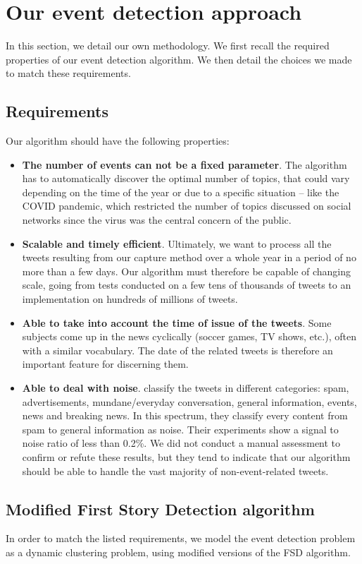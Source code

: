 \section{Our event detection approach}

In this section, we detail our own methodology. We first recall the required properties of our event detection algorithm. We then detail the choices we made to match these requirements.
\subsection{Requirements}
Our algorithm should have the following properties:
\begin{itemize}
    \item \textbf{The number of events can not be a fixed parameter}. The algorithm has to automatically discover the optimal number of topics, that could vary depending on the time of the year or due to a specific situation -- like the COVID pandemic, which restricted the number of topics discussed on social networks since the virus was the central concern of the public.
    \item \textbf{Scalable and timely efficient}. Ultimately, we want to process all the tweets resulting from our capture method over a whole year in a period of no more than a few days. Our algorithm must therefore be capable of changing scale, going from tests conducted on a few tens of thousands of tweets to an implementation on hundreds of millions of tweets.
    \item \textbf{Able to take into account the time of issue of the tweets}. Some subjects come up in the news cyclically (soccer games, TV shows, etc.), often with a similar vocabulary. The date of the related tweets is therefore an important feature for discerning them.
    \item \textbf{Able to deal with noise}. \citet{liu_reuters_2017} classify the tweets in different categories: spam, advertisements, mundane/everyday conversation, general information, events, news and breaking news. In this spectrum, they classify every content from spam to general information as noise. Their experiments show a signal to noise ratio of less than 0.2\%. We did not conduct a manual assessment to confirm or refute these results, but they tend to indicate that our algorithm should be able to handle the vast majority of non-event-related tweets.
\end{itemize}

\subsection{Modified First Story Detection algorithm}
In order to match the listed requirements, we model the event detection problem as a dynamic clustering problem, using modified versions of the FSD algorithm.
